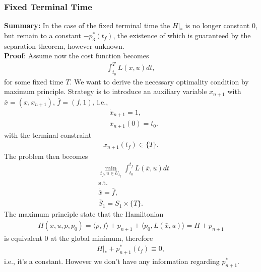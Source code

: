 \subsubsection{Fixed Terminal Time}
\textbf{Summary:} In the case of the fixed terminal time the $H|_*$ is no longer constant 0, but remain to a constant $-p_3^*(t_f)$, the existence of which is guaranteed by the separation theorem, however unknown.\\
\textbf{Proof}: Assume now the cost function becomes
\begin{align*}
	\int_{t_0}^T L(x, u) dt,
\end{align*}
for some fixed time $T$. We want to derive the necessary optimality condition by maximum principle. Strategy is to introduce an auxiliary variable $x_{n + 1} $ with $\bar{x} = (x, x_{n + 1})$, $\bar{f} = (f, 1)$, i.e.,  
\begin{align*}
	&\dot{x}_{n+1} = 1,\\
	&x_{n + 1}(0) = t_0. 
\end{align*}
with the terminal constraint
\begin{align*}
	x_{n+1}(t_f) \in \{T \}.
\end{align*}
The problem then becomes
\begin{align*}
	& \min_{t_f, u \in U_{t_f}} \int_{t_0}^{t_f}L(\bar{x}, u) dt \\
	& \text{s.t.}\\
	& \dot{\bar{x}} = \bar{f}, \\
	& \bar{S}_1 = S_1 \times \{T\}. 
\end{align*}
The maximum principle state that the Hamiltonian
\begin{align*}
	H(x, u, p, p_0) = \langle p, f \rangle + p_{n + 1} + \langle p_0, L(\bar{x}, u) \rangle = H + p_{n + 1} 
\end{align*}
is equivalent 0 at the global minimum, therefore
\begin{align*}
	H|_* + p^*_{n + 1}(t_f) \equiv 0, 
\end{align*} 
i.e., it's a constant. However we don't have any information regarding $p_{n + 1}^*$. 

